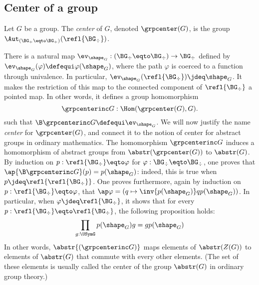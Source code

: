\subsection{Center of a group}
\label{sec:center-group}

\begin{definition}
  Let $G$ be a group. The {\em center} of $G$, denoted
  $\grpcenter(G)$, is the group
  $\Aut_{(\BG_\div\eqto\BG_\div)}(\refl{\BG_\div})$.%
\end{definition}

There is a natural map
$\ev_{\shape_G} : (\BG_\div\eqto\BG_\div) \to \BG_\div$ defined by
$\ev_{\shape_G}(\varphi)\defequi \varphi(\shape_G)$, where the path
$\varphi$ is coerced to a function through univalence. In particular,
$\ev_{\shape_G}(\refl{\BG_\div}) \jdeq \shape_G$. It makes the
restriction of this map to the connected component of
$\refl{\BG_\div}$ a pointed map. In other words, it defines a group
homomorphism
\begin{displaymath}
  \grpcenterinc G : \Hom(\grpcenter(G), G).
\end{displaymath}
such that $\B \grpcenterinc G \defequi \ev_{\shape_G}$. We will now
justify the name {\em center} for $\grpcenter(G)$, and connect it to
the notion of center for abstract groups in ordinary mathematics. The
homomorphism $\grpcenterinc G$ induces a homomorphism of abstract
groups from $\abstr(\grpcenter(G))$ to $\abstr(G)$. By induction on
$p:\refl{\BG_\div} \eqto \varphi$ for
$\varphi:\BG_\div \eqto \BG_\div$, one proves that
$\ap{\B \grpcenterinc G}(p) = p(\shape_G)$: indeed, this is true when
$p\jdeq \refl {\refl{\BG_\div}}$. One proves furthermore, again by
induction on $p:\refl{\BG_\div} \eqto \varphi$, that
$\ap \varphi = (q\mapsto \inv{p(\shape_G)} q p(\shape_G))$. In
particular, when $\varphi \jdeq \refl{\BG_\div}$, it shows that for
every $p:\refl{\BG_\div}\eqto\refl{\BG_\div}$, the following proposition
holds:
\begin{displaymath}
  \prod_{g:\USymG }p(\shape_G) g = g p(\shape_G)
\end{displaymath}
In other words, $\abstr{(\grpcenterinc G)}$ maps elements of
$\abstr(Z(G))$ to elements of $\abstr(G)$ that commute with every
other elements. (The set of these elements is usually called the
center of the group $\abstr(G)$ in ordinary group theory.)

